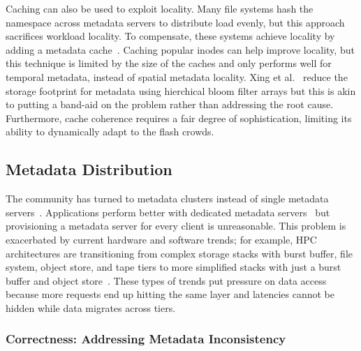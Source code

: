 Caching can also be used to exploit locality.  Many file systems hash the
namespace across metadata servers to distribute load evenly, but this approach
sacrifices workload locality. To compensate, these systems achieve locality by
adding a metadata cache~\cite{li:msst2006-dynamic, xing:sc2009-skyfs,
zhu:pds2008-hba}.  Caching popular inodes can help improve locality, but this
technique is limited by the size of the caches and only performs well for
temporal metadata, instead of spatial metadata locality. Xing et
al.~\cite{xing:sc2009-skyfs} reduce the storage footprint for metadata using
hierchical bloom filter arrays but this is akin to putting a band-aid on the
problem rather than addressing the root cause.  Furthermore, cache coherence
requires a fair degree of sophistication, limiting its ability to dynamically
adapt to the flash crowds.

\subsection{Metadata Distribution}

The community has turned to metadata clusters instead of single metadata
servers~\cite{patil:fast2011-giga+,weil:osdi2006-ceph,weil:sc2004-dyn-metadata,
sinnamohideen:atc2010-ursa, xing:sc2009-skyfs}.  Applications perform better
with dedicated metadata servers~\cite{sevilla:sc15-mantle, ren:sc2014-indexfs}
but provisioning a metadata server for every client is unreasonable. This
problem is exacerbated by current hardware and software trends; for example,
HPC architectures are transitioning from complex storage stacks with burst
buffer, file system, object store, and tape tiers to more simplified stacks
with just a burst buffer and object store~\cite{bent:login16-hpc-trends}. These
types of trends put pressure on data access because more requests end up
hitting the same layer and latencies cannot be hidden while data migrates
across tiers.

\subsubsection{Correctness: Addressing Metadata Inconsistency}

